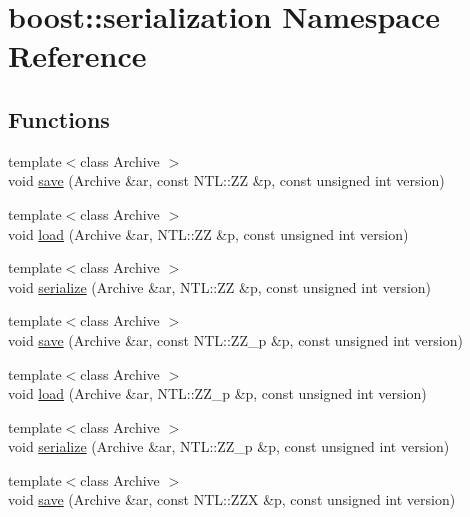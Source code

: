 \hypertarget{namespaceboost_1_1serialization}{}\section{boost\+:\+:serialization Namespace Reference}
\label{namespaceboost_1_1serialization}
\subsection*{Functions}
\begin{DoxyCompactItemize}
\item 
{\footnotesize template$<$class Archive $>$ }\\void \hyperlink{namespaceboost_1_1serialization_a7c8cd6b4a705476128a04299a9d0ab02}{save} (Archive \&ar, const N\+T\+L\+::\+ZZ \&p, const unsigned int version)
\item 
{\footnotesize template$<$class Archive $>$ }\\void \hyperlink{namespaceboost_1_1serialization_ac9d9d4bc06458befc413756326393db1}{load} (Archive \&ar, N\+T\+L\+::\+ZZ \&p, const unsigned int version)
\item 
{\footnotesize template$<$class Archive $>$ }\\void \hyperlink{namespaceboost_1_1serialization_ac305bc4c0e58113a47100a24ff100480}{serialize} (Archive \&ar, N\+T\+L\+::\+ZZ \&p, const unsigned int version)
\item 
{\footnotesize template$<$class Archive $>$ }\\void \hyperlink{namespaceboost_1_1serialization_a9d93508b5efacb662d1ab755d3d9b828}{save} (Archive \&ar, const N\+T\+L\+::\+Z\+Z\+\_\+p \&p, const unsigned int version)
\item 
{\footnotesize template$<$class Archive $>$ }\\void \hyperlink{namespaceboost_1_1serialization_a010ed145b746e6d7c5d4e643ff39145b}{load} (Archive \&ar, N\+T\+L\+::\+Z\+Z\+\_\+p \&p, const unsigned int version)
\item 
{\footnotesize template$<$class Archive $>$ }\\void \hyperlink{namespaceboost_1_1serialization_a8f14c5980a9e7f5b1f04f96cb7ef6054}{serialize} (Archive \&ar, N\+T\+L\+::\+Z\+Z\+\_\+p \&p, const unsigned int version)
\item 
{\footnotesize template$<$class Archive $>$ }\\void \hyperlink{namespaceboost_1_1serialization_a02839a8348cf5e4adfac1f031eb0bf02}{save} (Archive \&ar, const N\+T\+L\+::\+Z\+ZX \&p, const unsigned int version)

\end{DoxyCompactItemize}
